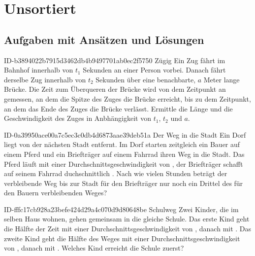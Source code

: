 \setcounter{chapter}{-1}
\chapter{Unsortiert}

\section{Aufgaben mit Ansätzen und Lösungen}

\begin{exercise}
      {ID-b3894022b7915d3462db4b9497701ab0ec2f5750}
      {Zügig}
  \ifproblem\problem
    Ein Zug fährt im Bahnhof innerhalb von $t_{1}$ Sekunden an einer Person vorbei.
    Danach fährt derselbe Zug innerhalb von $t_{2}$ Sekunden über eine benachbarte,
    $a$ Meter lange Brücke. Die Zeit zum Überqueren der Brücke wird von dem Zeitpunkt
    an gemessen, an dem die Spitze des Zuges die Brücke erreicht, bis zu dem
    Zeitpunkt, an dem das Ende des Zuges die Brücke verlässt.
    Ermittle die Länge und die Geschwindigkeit des Zuges in Anbhängigkeit von $t_{1}$,
    $t_{2}$ und $a$.
  \fi
\end{exercise}

\begin{exercise}
      {ID-0a39950ace00a7c5ec3c0db4d6873aae39deb51a}
      {Der Weg in die Stadt}
  \ifproblem\problem
    Ein Dorf liegt  von der nächsten Stadt entfernt. Im Dorf starten zeitgleich
    ein Bauer auf einem Pferd und ein Briefträger auf einem Fahrrad ihren Weg in die Stadt.
    Das Pferd läuft mit einer Durchschnittsgeschwindigkeit von , der Briefträger
    schafft auf seinem Fahrrad duchschnittlich . Nach wie vielen Stunden beträgt
    der verbleibende Weg bis zur Stadt für den Briefträger nur noch ein Drittel des für
    den Bauern verbleibenden Weges?
  \fi
\end{exercise}

\begin{exercise}
      {ID-fffc17cb928a23befe424d29a4c070d9d80648be}
      {Schulweg}
  \ifproblem\problem
    Zwei Kinder, die im selben Haus wohnen, gehen gemeinsam in die gleiche
    Schule. Das erste Kind geht die Hälfte der Zeit mit einer
    Durchschnittsgeschwindigkeit von , danach mit . Das
    zweite Kind geht die Hälfte des Weges mit einer Durchschnittsgeschwindigkeit
    von , danach mit . Welches Kind erreicht die Schule
    zuerst?
  \fi
\end{exercise}

